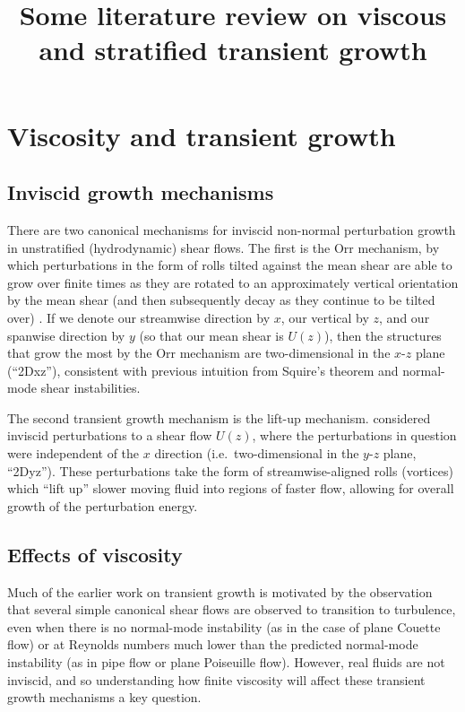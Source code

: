 \documentclass{article}
\begin{document}
\title{Some literature review on viscous and stratified transient growth}
\author{}
\date{}
\maketitle


\section{Viscosity and transient growth}

\subsection{Inviscid growth mechanisms}

There are two canonical mechanisms for inviscid non-normal perturbation growth in unstratified (hydrodynamic) shear flows. The first is the Orr mechanism, by which perturbations in the form of rolls tilted against the mean shear are able to grow over finite times as they are rotated to an approximately vertical orientation by the mean shear (and then subsequently decay as they continue to be tilted over) \citep{Orr1907a}. If we denote our streamwise direction by $x$, our vertical by $z$, and our spanwise direction by $y$ (so that our mean shear is $U(z)$), then the structures that grow the most by the Orr mechanism are two-dimensional in the $x$-$z$ plane (``2Dxz''), consistent with previous intuition from Squire's theorem and normal-mode shear instabilities. 

The second transient growth mechanism is the lift-up mechanism. \citet{Ellingsen1975} considered inviscid perturbations to a shear flow $U(z)$, where the perturbations in question were independent of the $x$ direction (i.e.~two-dimensional in the $y$-$z$ plane, ``2Dyz''). These perturbations take the form of streamwise-aligned rolls (vortices) which ``lift up'' slower moving fluid into regions of faster flow, allowing for overall growth of the perturbation energy. 

\subsection{Effects of viscosity}

Much of the earlier work on transient growth is motivated by the observation that several simple canonical shear flows are observed to transition to turbulence, even when there is no normal-mode instability (as in the case of plane Couette flow) or at Reynolds numbers much lower than the predicted normal-mode instability (as in pipe flow or plane Poiseuille flow). However, real fluids are not inviscid, and so understanding how finite viscosity will affect these transient growth mechanisms a key question. 
\end{document}
